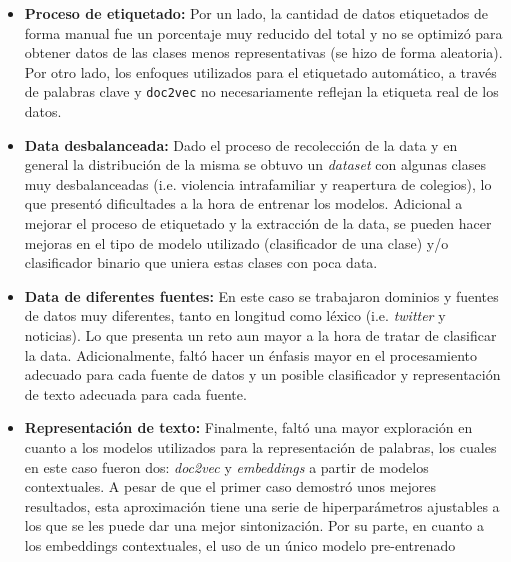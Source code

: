 \begin{itemize}
    \item \textbf{Proceso de etiquetado:} Por un lado, la cantidad de datos etiquetados de forma manual fue un porcentaje muy reducido del total y no se optimizó para obtener datos de las clases menos representativas (se hizo de forma aleatoria). Por otro lado, los enfoques utilizados para el etiquetado automático, a través de palabras clave y \texttt{doc2vec} no necesariamente reflejan la etiqueta real de los datos.
    
    \item \textbf{Data desbalanceada:} Dado el proceso de recolección de la data y en general la distribución de la misma se obtuvo un \textit{dataset} con algunas clases muy desbalanceadas (i.e. violencia intrafamiliar y reapertura de colegios), lo que presentó dificultades a la hora de entrenar los modelos. Adicional a mejorar el proceso de etiquetado y la extracción de la data, se pueden hacer mejoras en el tipo de modelo utilizado (clasificador de una clase) y/o clasificador binario que uniera estas clases con poca data.
    
    \item \textbf{Data de diferentes fuentes:} En este caso se trabajaron dominios y fuentes de datos muy diferentes, tanto en longitud como léxico (i.e. \textit{twitter} y noticias). Lo que presenta un reto aun mayor a la hora de tratar de clasificar la data. Adicionalmente, faltó hacer un énfasis mayor en el procesamiento adecuado para cada fuente de datos y un posible clasificador y representación de texto adecuada para cada fuente.
    
    \item \textbf{Representación de texto:} Finalmente, faltó una mayor exploración en cuanto a los modelos utilizados para la representación de palabras, los cuales en este caso fueron dos: \textit{doc2vec} y \textit{embeddings} a partir de modelos contextuales. A pesar de que el primer caso demostró unos mejores resultados, esta aproximación tiene una serie de hiperparámetros ajustables a los que se les puede dar una mejor sintonización. Por su parte, en cuanto a los embeddings contextuales, el uso de un único modelo pre-entrenado 
\end{itemize}

